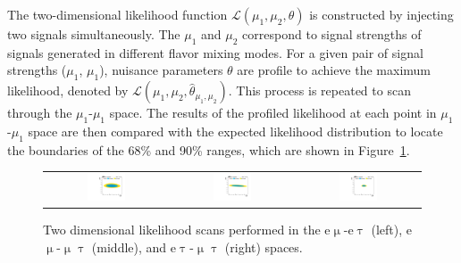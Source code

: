 The two-dimensional likelihood function $\mathcal{L}(\mu_1, \mu_2, \theta)$ is constructed by injecting two signals simultaneously. The $\mu_1$ and $\mu_2$ correspond to signal strengths of signals generated in different flavor mixing modes. For a given pair of signal strengths ($\mu_1$, $\mu_1$), nuisance parameters $\theta$ are profile to achieve the maximum likelihood, denoted by $\mathcal{L}(\mu_1, \mu_2, \hat{\theta}_{\mu_1,\mu_2})$. This process is repeated to scan through the $\mu_1$-$\mu_1$ space. The results of the profiled likelihood at each point in $\mu_1$-$\mu_1$ space are then compared with the expected likelihood distribution to locate the boundaries of the 68\% and 90\% ranges, which are shown in Figure~\ref{fig:2DScan}.

 \begin{figure}[tbh!]
 \begin{center}
 \begin{tabular}{ccc}
 \includegraphics[width=0.33\textwidth]{figures/Part4/Sensitivity/2dScan_emuetau}&
 \includegraphics[width=0.33\textwidth]{figures/Part4/Sensitivity/2dScan_emumutau}&
 \includegraphics[width=0.33\textwidth]{figures/Part4/Sensitivity/2dScan_etaumutau}\\
 \end{tabular}
 \caption{Two dimensional likelihood scans performed in the e$\upmu$-e$\uptau$ (left), e$\upmu$-$\upmu\uptau$ (middle), and e$\uptau$-$\upmu\uptau$ (right) spaces.}
 \label{fig:2DScan}
 \end{center}
 \end{figure}